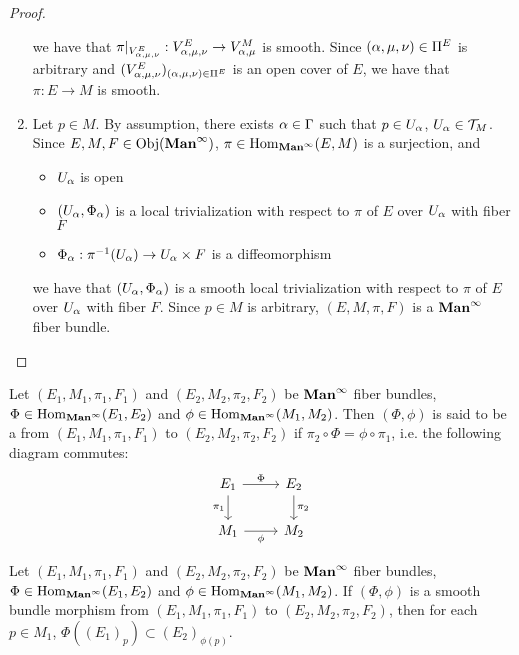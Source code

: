 \documentclass{book}
\begin{document}
\begin{proof}
\begin{enumerate}
\begin{itemize}
			\end{itemize}
			we have that $\pi|_{V^E_{\alpha, \mu, \nu}}: V^E_{\alpha, \mu, \nu} \rightarrow V^M_{\alpha, \mu}$ is smooth. Since $(\alpha, \mu, \nu) \in \Pi^E$ is arbitrary and $(V^E_{\alpha, \mu, \nu})_{(\alpha, \mu, \nu) \in \Pi^E }$ is an open cover of $E$, we have that $\pi:E \rightarrow M$ is smooth.
			\item Let $p \in M$. By assumption, there exists $\alpha \in \Gamma$ such that $p \in U_{\alpha}$, $U_{\alpha} \in \mathcal{T}_M$. Since $E,M,F \in \operatorname{Obj}(\operatorname*{\text{\textbf{Man}}^{\infty}})$, $\pi \in \operatorname{Hom}_{\operatorname*{\text{\textbf{Man}}^{\infty}}}(E,M)$ is a surjection, and 
			\begin{itemize}
				\item $U_{\alpha}$ is open
				\item $(U_{\alpha}, \Phi_{\alpha})$ is a local trivialization with respect to $\pi$ of $E$ over $U_{\alpha}$ with fiber $F$
				\item $\Phi_{\alpha}: \pi^{-1}(U_{\alpha}) \rightarrow U_{\alpha} \times F$ is a diffeomorphism
			\end{itemize}
			we have that $(U_{\alpha}, \Phi_{\alpha})$ is a smooth local trivialization with respect to $\pi$ of $E$ over $U_{\alpha}$ with fiber $F$. Since $p \in M$ is arbitrary, $(E, M, \pi, F)$ is a $\operatorname*{\text{\textbf{Man}}^{\infty}}$ fiber bundle.  
		\end{enumerate}
	\end{proof}

	\begin{defn} 
		Let $(E_1, M_1, \pi_1, F_1)$ and $(E_2, M_2, \pi_2, F_2)$ be $\operatorname*{\text{\textbf{Man}}^{\infty}}$ fiber bundles, $\Phi \in \operatorname{Hom}_{\operatorname*{\text{\textbf{Man}}^{\infty}}}(E_1, E_2)$ and $\phi \in \operatorname{Hom}_{\operatorname*{\text{\textbf{Man}}^{\infty}}}(M_1, M_2)$. Then $(\Phi, \phi)$ is said to be a  from $(E_1, M_1, \pi_1, F_1)$ to $(E_2, M_2, \pi_2, F_2)$ if 
		$\pi_2 \circ \Phi = \phi \circ \pi_1$, 
		i.e. the following diagram commutes:
		\[ 
		\begin{tikzcd}
			E_1 \arrow[r, "\Phi"] \arrow[d, "\pi_1"'] & E_2  \arrow[d, "\pi_2"] \\
			M_1 \arrow[r, "\phi"']                  & M_2
		\end{tikzcd}
		\] 
	\end{defn}

	\begin{ex}
		Let $(E_1, M_1, \pi_1, F_1)$ and $(E_2, M_2, \pi_2, F_2)$ be $\operatorname*{\text{\textbf{Man}}^{\infty}}$ fiber bundles, $\Phi \in \operatorname{Hom}_{\operatorname*{\text{\textbf{Man}}^{\infty}}}(E_1, E_2)$ and $\phi \in \operatorname{Hom}_{\operatorname*{\text{\textbf{Man}}^{\infty}}}(M_1, M_2)$. If $(\Phi, \phi)$ is a smooth bundle morphism from $(E_1, M_1, \pi_1, F_1)$ to $(E_2, M_2, \pi_2, F_2)$, then for each $p \in M_1$, $\Phi({(E_1)_p}) \subset (E_2)_{\phi(p)}$.
	\end{ex}
\end{document}
